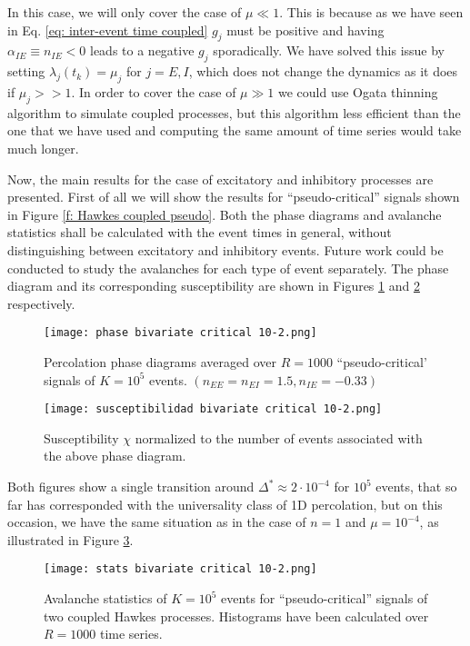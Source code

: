 In this case, we will only cover the case of $\mu\ll 1$. 
This is because as we have seen in Eq. \ref{eq: inter-event time coupled} $g_j$ must be positive and having $\alpha_{IE}\equiv n_{IE}<0$ leads to a negative $g_j$ sporadically. 
We have solved this issue by setting $\lambda_j(t_k)=\mu_j$ for $j=E,I$, which does not change the dynamics as it does if $\mu_j>>1$. In order to cover the case of $\mu\gg 1$ we could 
use Ogata thinning algorithm \cite{ogata1981lewis} to simulate coupled processes, but this algorithm less efficient than the one that we have used and computing the same amount of
time series would take much longer. 

Now, the main results for the case of excitatory and inhibitory processes are presented. First of all we will show the results for ``pseudo-critical'' 
signals shown in Figure \ref{f: Hawkes coupled pseudo}. Both the phase diagrams and avalanche statistics shall be calculated with the event times in general, without distinguishing
between excitatory and inhibitory events. Future work could be conducted to study the avalanches for each type of event separately. 
The phase diagram and its corresponding susceptibility 
are shown in Figures \ref{f:phase_diagram_coupled critical} and \ref{f:susceptibilidad_coupled critical} respectively. 
\begin{figure}[H]
    \centering
    \texttt{[image: phase bivariate critical 10-2.png]}
    \caption{Percolation phase diagrams averaged over $R=1000$ ``pseudo-critical' signals of $K=10^5$ events. $\left( n_{EE}=n_{EI}=1.5, n_{IE}=-0.33 \right)$} 
    \label{f:phase_diagram_coupled critical}
\end{figure}

\begin{figure}[H]
    \centering
    \texttt{[image: susceptibilidad bivariate critical 10-2.png]}
    \caption{Susceptibility $\chi$ normalized to the number of events associated with the above phase diagram.}
    \label{f:susceptibilidad_coupled critical}
\end{figure}

Both figures show a single transition around $\Delta^*\approx 2\cdot 10^{-4}$ for $10^5$ events, that so far has corresponded with the universality class of 1D percolation, but on this occasion, we have the same 
situation as in the case of $n=1$ and $\mu=10^{-4}$, as illustrated in Figure \ref{f: stats pseudocritical}.

\begin{figure}[H]
    \centering
    \texttt{[image: stats bivariate critical 10-2.png]}
    \caption{Avalanche statistics of $K=10^5$ events for ``pseudo-critical'' signals of two coupled Hawkes processes. Histograms have been calculated over $R=1000$ time series.}
    \label{f: stats pseudocritical}
\end{figure}

